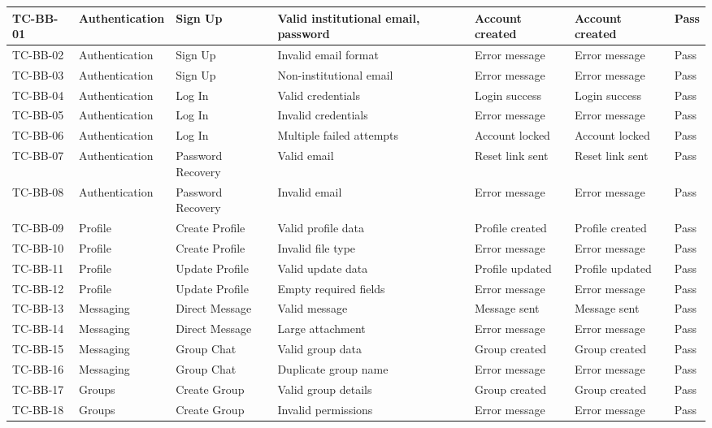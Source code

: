 {\begin{longtable}{|C{1.5cm}|C{2.2cm}|C{2cm}|C{2cm}|C{2cm}|C{2cm}|C{1cm}|}
TC-BB-01 & Authentication & Sign Up & Valid institutional email, password & Account created & Account created & Pass \\
\hline
TC-BB-02 & Authentication & Sign Up & Invalid email format & Error message & Error message & Pass \\
\hline
TC-BB-03 & Authentication & Sign Up & Non-institutional email & Error message & Error message & Pass \\
\hline
TC-BB-04 & Authentication & Log In & Valid credentials & Login success & Login success & Pass \\
\hline
TC-BB-05 & Authentication & Log In & Invalid credentials & Error message & Error message & Pass \\
\hline
TC-BB-06 & Authentication & Log In & Multiple failed attempts & Account locked & Account locked & Pass \\
\hline
TC-BB-07 & Authentication & Password Recovery & Valid email & Reset link sent & Reset link sent & Pass \\
\hline
TC-BB-08 & Authentication & Password Recovery & Invalid email & Error message & Error message & Pass \\
\hline
TC-BB-09 & Profile & Create Profile & Valid profile data & Profile created & Profile created & Pass \\
\hline
TC-BB-10 & Profile & Create Profile & Invalid file type & Error message & Error message & Pass \\
\hline
TC-BB-11 & Profile & Update Profile & Valid update data & Profile updated & Profile updated & Pass \\
\hline
TC-BB-12 & Profile & Update Profile & Empty required fields & Error message & Error message & Pass \\
\hline
TC-BB-13 & Messaging & Direct Message & Valid message & Message sent & Message sent & Pass \\
\hline
TC-BB-14 & Messaging & Direct Message & Large attachment & Error message & Error message & Pass \\
\hline
TC-BB-15 & Messaging & Group Chat & Valid group data & Group created & Group created & Pass \\
\hline
TC-BB-16 & Messaging & Group Chat & Duplicate group name & Error message & Error message & Pass \\
\hline
TC-BB-17 & Groups & Create Group & Valid group details & Group created & Group created & Pass \\
\hline
TC-BB-18 & Groups & Create Group & Invalid permissions & Error message & Error message & Pass \\

\end{longtable}}
